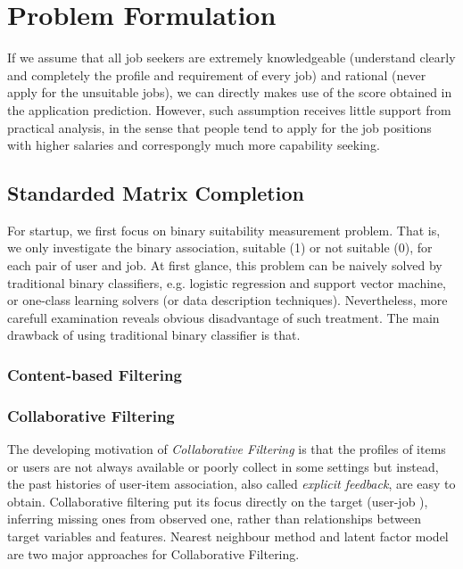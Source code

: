 \documentclass{article} %
\begin{document}
\section{Problem Formulation}
If we assume that all job seekers are extremely knowledgeable (understand
clearly and completely the profile and requirement of every job) and rational
(never apply for the unsuitable jobs), we can directly makes use of the score
obtained in the application prediction. However, such assumption receives
little support from practical analysis, in the sense that people tend to apply
for the job positions with higher salaries and correspongly much more
capability seeking.

\subsection{Standarded Matrix Completion}
For startup, we first focus on binary suitability measurement problem. That
is, we only investigate the binary association, suitable (1) or not suitable
(0), for each pair of user and job. 
At first glance, this problem can be naively solved by traditional binary
classifiers, e.g. logistic regression and support vector machine, or one-class
learning solvers (or data description techniques).
Nevertheless, more carefull examination reveals obvious disadvantage of such
treatment. The main drawback of using traditional binary classifier is that.

\subsubsection{Content-based Filtering}

\subsubsection{Collaborative Filtering}
The developing motivation of {\it Collaborative Filtering} is that the
profiles of items or users are not always available or poorly collect in
some settings but instead, the past histories of user-item association, also called {\it
    explicit feedback}, are easy to obtain. Collaborative filtering put its
focus directly on the target (user-job ), inferring missing ones from observed
one, rather than relationships between target
variables and features. Nearest neighbour method and latent factor model are
two major approaches for Collaborative Filtering.
\end{document}
